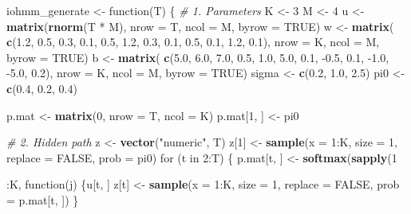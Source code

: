 \documentclass[]{article}
\newenvironment{Shaded}{\begin{snugshade}}{\end{snugshade}}
\newcommand{\KeywordTok}[1]{\textcolor[rgb]{0.13,0.29,0.53}{\textbf{{#1}}}}
\newcommand{\DataTypeTok}[1]{\textcolor[rgb]{0.13,0.29,0.53}{{#1}}}
\newcommand{\DecValTok}[1]{\textcolor[rgb]{0.00,0.00,0.81}{{#1}}}
\newcommand{\FloatTok}[1]{\textcolor[rgb]{0.00,0.00,0.81}{{#1}}}
\newcommand{\StringTok}[1]{\textcolor[rgb]{0.31,0.60,0.02}{{#1}}}
\newcommand{\CommentTok}[1]{\textcolor[rgb]{0.56,0.35,0.01}{\textit{{#1}}}}
\newcommand{\OtherTok}[1]{\textcolor[rgb]{0.56,0.35,0.01}{{#1}}}
\newcommand{\NormalTok}[1]{{#1}}
\begin{document}
{{{\begin{Shaded}
\begin{Highlighting}[]
\NormalTok{iohmm_generate <-}\StringTok{ }\NormalTok{function(T) \{}
  \CommentTok{# 1. Parameters}
  \NormalTok{K <-}\StringTok{ }\DecValTok{3}
  \NormalTok{M <-}\StringTok{ }\DecValTok{4}
  \NormalTok{u <-}\StringTok{ }\KeywordTok{matrix}\NormalTok{(}\KeywordTok{rnorm}\NormalTok{(T *}\StringTok{ }\NormalTok{M), }\DataTypeTok{nrow =} \NormalTok{T, }\DataTypeTok{ncol =} \NormalTok{M, }\DataTypeTok{byrow =} \OtherTok{TRUE}\NormalTok{)}
  \NormalTok{w <-}\StringTok{ }\KeywordTok{matrix}\NormalTok{(}
    \KeywordTok{c}\NormalTok{(}\FloatTok{1.2}\NormalTok{, }\FloatTok{0.5}\NormalTok{, }\FloatTok{0.3}\NormalTok{, }\FloatTok{0.1}\NormalTok{, }\FloatTok{0.5}\NormalTok{, }\FloatTok{1.2}\NormalTok{, }\FloatTok{0.3}\NormalTok{, }\FloatTok{0.1}\NormalTok{, }\FloatTok{0.5}\NormalTok{, }\FloatTok{0.1}\NormalTok{, }\FloatTok{1.2}\NormalTok{, }\FloatTok{0.1}\NormalTok{),}
    \DataTypeTok{nrow =} \NormalTok{K, }\DataTypeTok{ncol =} \NormalTok{M, }\DataTypeTok{byrow =} \OtherTok{TRUE}\NormalTok{)}
  \NormalTok{b <-}\StringTok{ }\KeywordTok{matrix}\NormalTok{(}
    \KeywordTok{c}\NormalTok{(}\FloatTok{5.0}\NormalTok{, }\FloatTok{6.0}\NormalTok{, }\FloatTok{7.0}\NormalTok{, }\FloatTok{0.5}\NormalTok{, }\FloatTok{1.0}\NormalTok{, }\FloatTok{5.0}\NormalTok{, }\FloatTok{0.1}\NormalTok{, -}\FloatTok{0.5}\NormalTok{, }\FloatTok{0.1}\NormalTok{, -}\FloatTok{1.0}\NormalTok{, -}\FloatTok{5.0}\NormalTok{, }\FloatTok{0.2}\NormalTok{),}
    \DataTypeTok{nrow =} \NormalTok{K, }\DataTypeTok{ncol =} \NormalTok{M, }\DataTypeTok{byrow =} \OtherTok{TRUE}\NormalTok{)}
  \NormalTok{sigma <-}\StringTok{ }\KeywordTok{c}\NormalTok{(}\FloatTok{0.2}\NormalTok{, }\FloatTok{1.0}\NormalTok{, }\FloatTok{2.5}\NormalTok{)}
  \NormalTok{pi0 <-}\StringTok{ }\KeywordTok{c}\NormalTok{(}\FloatTok{0.4}\NormalTok{, }\FloatTok{0.2}\NormalTok{, }\FloatTok{0.4}\NormalTok{)}
  
  \NormalTok{p.mat <-}\StringTok{ }\KeywordTok{matrix}\NormalTok{(}\DecValTok{0}\NormalTok{, }\DataTypeTok{nrow =} \NormalTok{T, }\DataTypeTok{ncol =} \NormalTok{K)}
  \NormalTok{p.mat[}\DecValTok{1}\NormalTok{, ] <-}\StringTok{ }\NormalTok{pi0}

  \CommentTok{# 2. Hidden path}
  \NormalTok{z <-}\StringTok{ }\KeywordTok{vector}\NormalTok{(}\StringTok{"numeric"}\NormalTok{, T)}
  \NormalTok{z[}\DecValTok{1}\NormalTok{] <-}\StringTok{ }\KeywordTok{sample}\NormalTok{(}\DataTypeTok{x =} \DecValTok{1}\NormalTok{:K, }\DataTypeTok{size =} \DecValTok{1}\NormalTok{, }\DataTypeTok{replace =} \OtherTok{FALSE}\NormalTok{, }\DataTypeTok{prob =} \NormalTok{pi0)}
  \NormalTok{for (t in }\DecValTok{2}\NormalTok{:T) \{}
    \NormalTok{p.mat[t, ] <-}\StringTok{ }\KeywordTok{softmax}\NormalTok{(}\KeywordTok{sapply}\NormalTok{(}\DecValTok{1}\NormalTok{:K, function(j) \{u[t, ] %
    \NormalTok{z[t] <-}\StringTok{ }\KeywordTok{sample}\NormalTok{(}\DataTypeTok{x =} \DecValTok{1}\NormalTok{:K, }\DataTypeTok{size =} \DecValTok{1}\NormalTok{, }\DataTypeTok{replace =} \OtherTok{FALSE}\NormalTok{, }\DataTypeTok{prob =} \NormalTok{p.mat[t, ])}
  \NormalTok{\}}

}
\end{Highlighting}
\end{Shaded}}}}
\end{document}
